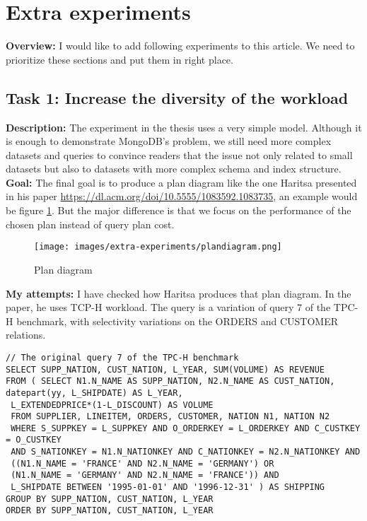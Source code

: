 \section{Extra experiments}
\textbf{Overview:} I would like to add following experiments to this article. We need to prioritize these sections and put them in right place.

\subsection{Task 1: Increase the diversity of the workload}
\noindent\textbf{Description: } The experiment in the thesis uses a very simple model. Although it is enough to demonstrate MongoDB's problem, we still need more complex datasets and queries to convince readers that the issue not only related to small datasets but also to datasets with more complex schema and index structure.\\ 

\noindent\textbf{Goal:} The final goal is to produce a plan diagram like the one Haritsa presented in his paper \url{https://dl.acm.org/doi/10.5555/1083592.1083735}, an example would be figure \ref{fig:plandiagram}. But the major difference is that we focus on the performance of the chosen plan instead of query plan cost.\\

\begin{figure}[tph]
    \centering
    \texttt{[image: images/extra-experiments/plandiagram.png]}
    \caption{Plan diagram}
    \label{fig:plandiagram}
\end{figure}

\noindent\textbf{My attempts: } 
I have checked how Haritsa produces that plan diagram. In the paper, he uses TCP-H workload. The query is a variation of query 7 of the TPC-H benchmark, with selectivity variations on the ORDERS and CUSTOMER relations. \\

\begin{verbatim}
// The original query 7 of the TPC-H benchmark
SELECT SUPP_NATION, CUST_NATION, L_YEAR, SUM(VOLUME) AS REVENUE
FROM ( SELECT N1.N_NAME AS SUPP_NATION, N2.N_NAME AS CUST_NATION, 
datepart(yy, L_SHIPDATE) AS L_YEAR,
 L_EXTENDEDPRICE*(1-L_DISCOUNT) AS VOLUME
 FROM SUPPLIER, LINEITEM, ORDERS, CUSTOMER, NATION N1, NATION N2
 WHERE S_SUPPKEY = L_SUPPKEY AND O_ORDERKEY = L_ORDERKEY AND C_CUSTKEY = O_CUSTKEY
 AND S_NATIONKEY = N1.N_NATIONKEY AND C_NATIONKEY = N2.N_NATIONKEY AND
 ((N1.N_NAME = 'FRANCE' AND N2.N_NAME = 'GERMANY') OR
 (N1.N_NAME = 'GERMANY' AND N2.N_NAME = 'FRANCE')) AND
 L_SHIPDATE BETWEEN '1995-01-01' AND '1996-12-31' ) AS SHIPPING
GROUP BY SUPP_NATION, CUST_NATION, L_YEAR
ORDER BY SUPP_NATION, CUST_NATION, L_YEAR
\end{verbatim}

